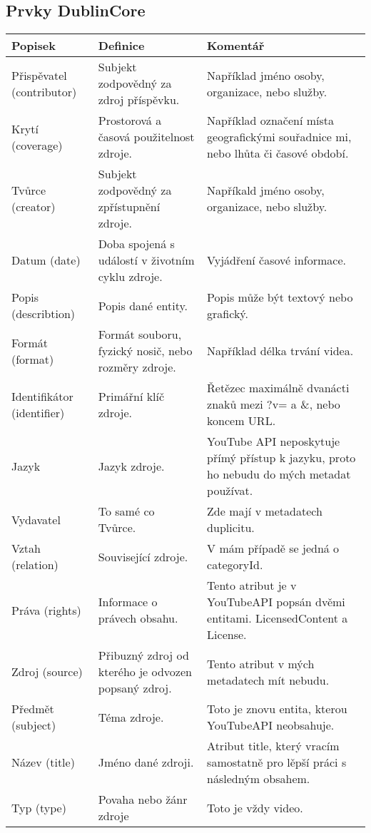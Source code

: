 \subsection{Prvky DublinCore}
\begin{tabular}{| p{2cm} | p{5cm} | p{5cm} |}
\hline
Popisek & Definice & Komentář\\
\hline
Přispěvatel (contributor) & Subjekt zodpovědný za zdroj příspěvku. & Například jméno osoby, organizace, nebo služby.\\
\hline
Krytí (coverage) & Prostorová a časová použitelnost zdroje. & Například označení místa geografickými souřadnice mi, nebo lhůta či časové období.\\
\hline
Tvůrce (creator) & Subjekt zodpovědný za zpřístupnění zdroje. & Napříkald jméno osoby, organizace, nebo služby.\\
\hline
Datum (date) & Doba spojená s událostí v životním cyklu zdroje. & Vyjádření časové informace. \\
\hline
Popis (describtion) & Popis dané entity. & Popis může být textový nebo grafický. \\
\hline
Formát (format) & Formát souboru, fyzický nosič, nebo rozměry zdroje. & Například délka trvání videa. \\
\hline
Identifikátor (identifier) & Primářní klíč zdroje. & Řetězec maximálně dvanácti znaků mezi ?v= a \&, nebo koncem URL.\\
\hline
Jazyk & Jazyk zdroje. & YouTube API neposkytuje přímý přístup k jazyku, proto ho nebudu do mých metadat používat.\\
\hline
Vydavatel & To samé co Tvůrce. & Zde mají v metadatech duplicitu. \\
\hline
Vztah (relation) & Související zdroje. & V mám případě se jedná o categoryId. \\
\hline
Práva (rights) & Informace o právech obsahu. & Tento atribut je v YouTubeAPI popsán dvěmi entitami. LicensedContent a License.\\
\hline
Zdroj (source) & Přibuzný zdroj od kterého je odvozen popsaný zdroj. & Tento atribut v mých metadatech mít nebudu.\\
\hline
Předmět (subject) & Téma zdroje. & Toto je znovu entita, kterou YouTubeAPI neobsahuje.\\
\hline
Název (title) & Jméno dané zdroji. & Atribut title, který vracím samostatně pro lěpší práci s následným obsahem.\\
\hline
Typ (type) & Povaha nebo žánr zdroje & Toto je vždy video.\\
\hline
\end{tabular}
